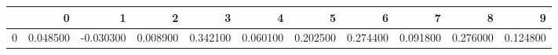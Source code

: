 \begin{tabular}{lrrrrrrrrrr}
\toprule
 & 0 & 1 & 2 & 3 & 4 & 5 & 6 & 7 & 8 & 9 \\
\midrule
0 & 0.048500 & -0.030300 & 0.008900 & 0.342100 & 0.060100 & 0.202500 & 0.274400 & 0.091800 & 0.276000 & 0.124800 \\
\bottomrule
\end{tabular}
